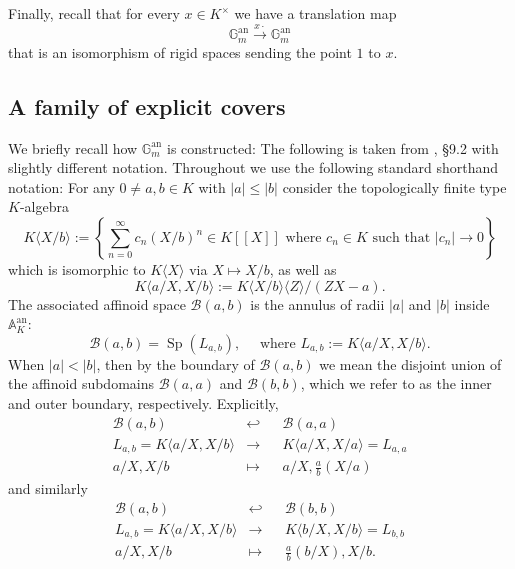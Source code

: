 \documentclass[10pt,oneside]{amsart}
\theoremstyle{definition}
\begin{document}
	Finally, recall that for every $x\in K^\times$ we have a translation map
	\[\mathbb G_m^{\operatorname{an}}\xrightarrow{x\cdot} \mathbb G_m^{\operatorname{an}}\]
	that is an isomorphism of rigid spaces sending the point $1$ to $x$.
	
	\subsection{A family of explicit covers}
	We briefly recall how $\mathbb G_m^{\operatorname{an}}$ is constructed: The following is taken from \cite{Bosch lectures}, \S 9.2 with slightly different notation. Throughout we use the following standard shorthand notation: For any $0\ne a,b\in K$ with $|a|\leq |b|$ consider the topologically finite type $K$-algebra
	\[K\langle X/b\rangle := \left\{\sum_{n=0}^{\infty} c_n (X/b)^n\in K[[X]] \text{ where } c_n\in K \text{ such that } |c_n|\to 0 \right\}\]
	which is isomorphic to $K\langle X\rangle $ via $X\mapsto X/b$, as well as
	\[K\langle a/X,X/b\rangle := K\langle X/b\rangle 		\langle Z\rangle/(ZX-a). \]
	The associated affinoid space $\mathcal B(a,b)$ is the annulus of radii $|a|$ and $|b|$ inside $\mathbb A_K^{\operatorname{an}}$:
	\[\mathcal B(a,b) = \operatorname{Sp}(L_{a,b}),\quad \text{ where } L_{a,b} := K\langle a/X, X/b\rangle. \]
	When $|a|<|b|$, then by the boundary of $\mathcal B(a,b)$ we mean the disjoint union of the affinoid subdomains $\mathcal B(a,a)$ and $\mathcal B(b,b)$, which we refer to as the inner and outer boundary, respectively. Explicitly,
	\begin{equation}\label{torus explicit cover glue map 1}
	\begin{alignedat}{2}
	\mathcal B(a,b)&\hookleftarrow&& \mathcal B(a,a)\\
	L_{a,b}=K\langle a/X, X/b\rangle&\rightarrow &&K\langle a/X, X/a \rangle=L_{a,a}\\
	a/X, X/b &\mapsto&& a/X, \frac{a}{b}(X/a)
	\end{alignedat}
	\end{equation}
	and similarly 
	\begin{equation}\label{torus explicit cover glue map 2}
	\begin{alignedat}{2}
	\mathcal B(a,b)&\hookleftarrow&& \mathcal B(b,b)\\
	L_{a,b}=K\langle  a/X, X/b \rangle&\rightarrow &&K\langle  b/X, X/b \rangle=L_{b,b}\\
	a/X, X/b &\mapsto&& \frac{a}{b} (b/X), X/b.
	\end{alignedat}
	\end{equation}
\end{document}
